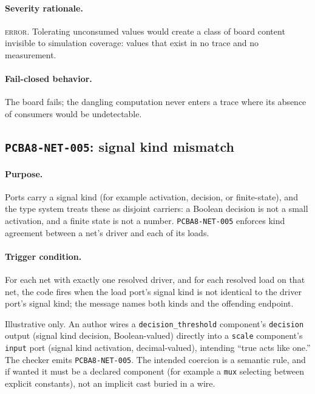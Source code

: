 \paragraph{Severity rationale.} \textsc{error}. Tolerating unconsumed values would create a class of board content invisible to simulation coverage: values that exist in no trace and no measurement.

\paragraph{Fail-closed behavior.} The board fails; the dangling computation never enters a trace where its absence of consumers would be undetectable.

\subsection{\texttt{PCBA8-NET-005}: signal kind mismatch}\label{ch07:sub:net005}

\paragraph{Purpose.} Ports carry a signal kind (for example activation, decision, or finite-state), and the type system treats these as disjoint carriers: a Boolean decision is not a small activation, and a finite state is not a number. \texttt{PCBA8-NET-005} enforces kind agreement between a net's driver and each of its loads.

\paragraph{Trigger condition.} For each net with exactly one resolved driver, and for each resolved load on that net, the code fires when the load port's signal kind is not identical to the driver port's signal kind; the message names both kinds and the offending endpoint.

\begin{example}\label{ch07:ex:net005}
Illustrative only. An author wires a \texttt{decision\_threshold} component's \texttt{decision} output (signal kind decision, Boolean-valued) directly into a \texttt{scale} component's \texttt{input} port (signal kind activation, decimal-valued), intending ``true acts like one.'' The checker emits \texttt{PCBA8-NET-005}. The intended coercion is a semantic rule, and if wanted it must be a declared component (for example a \texttt{mux} selecting between explicit constants), not an implicit cast buried in a wire.
\end{example}

